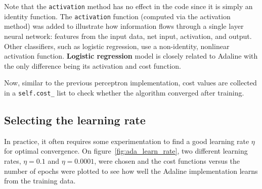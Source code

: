 \documentclass[11pt]{article}
\begin{document}
    Note that the \texttt{activation} method has no effect in the code since it is simply an identity function.
    The \texttt{activation} function (computed via the activation method) was added to illustrate how information flows through a single layer neural network: features from the input data, net input, activation, and output.
    Other classifiers, such as logistic regression, use a non-identity, nonlinear activation function.
    \textbf{Logistic regression} model is closely related to Adaline with the only difference being its activation and cost function.

    Now, similar to the previous perceptron implementation, cost values are collected in a \texttt{self.cost\_} list to check whether the algorithm converged after training.

    \subsection{Selecting the learning rate} \label{subsec:ada_learn_rate}

    In practice, it often requires some experimentation to find a good learning rate $\eta$ for optimal convergence.
    On figure~\ref{fig:ada_learn_rate}, two different learning rates, $\eta=0.1$ and $\eta=0.0001$, were chosen and the cost functions versus the number of epochs were plotted to see how well the Adaline implementation learns from the training data.
\end{document}
